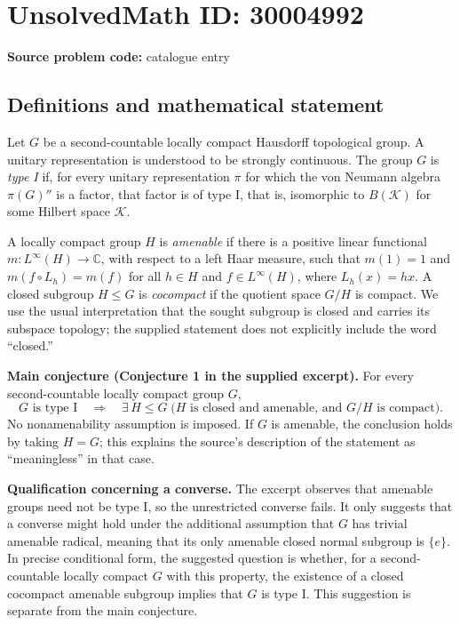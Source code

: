 \documentclass[11pt]{article}
\newcommand{\C}{\mathbb{C}}
\begin{document}
\section*{UnsolvedMath ID: 30004992}
\textbf{Source problem code:} catalogue entry
\subsection{Definitions and mathematical statement}
Let \(G\) be a second-countable locally compact Hausdorff topological group. A unitary representation is understood to be strongly continuous. The group \(G\) is \emph{type I} if, for every unitary representation \(\pi\) for which the von Neumann algebra \(\pi(G)''\) is a factor, that factor is of type I, that is, isomorphic to \(B(\mathcal K)\) for some Hilbert space \(\mathcal K\).

A locally compact group \(H\) is \emph{amenable} if there is a positive linear functional \(m:L^\infty(H)\to\C\), with respect to a left Haar measure, such that \(m(1)=1\) and \(m(f\circ L_h)=m(f)\) for all \(h\in H\) and \(f\in L^\infty(H)\), where \(L_h(x)=hx\). A closed subgroup \(H\leq G\) is \emph{cocompact} if the quotient space \(G/H\) is compact. We use the usual interpretation that the sought subgroup is closed and carries its subspace topology; the supplied statement does not explicitly include the word ``closed.''

\textbf{Main conjecture (Conjecture 1 in the supplied excerpt).} For every second-countable locally compact group \(G\),
\[
 G\text{ is type I}
 \quad\Longrightarrow\quad
 \exists\,H\leq G\;\bigl(H\text{ is closed and amenable, and }G/H\text{ is compact}\bigr).
\]
No nonamenability assumption is imposed. If \(G\) is amenable, the conclusion holds by taking \(H=G\); this explains the source's description of the statement as ``meaningless'' in that case.

\textbf{Qualification concerning a converse.} The excerpt observes that amenable groups need not be type I, so the unrestricted converse fails. It only suggests that a converse might hold under the additional assumption that \(G\) has trivial amenable radical, meaning that its only amenable closed normal subgroup is \(\{e\}\). In precise conditional form, the suggested question is whether, for a second-countable locally compact \(G\) with this property, the existence of a closed cocompact amenable subgroup implies that \(G\) is type I. This suggestion is separate from the main conjecture.
\end{document}
